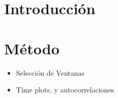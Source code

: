 \documentclass[11pt,a4paper,twoside]{tesis}
\begin{document}
\def\titulo{Licenciado }

\def\autor{Juan Manuel Pérez}
\def\tituloTesis{Mimetización entre interlocutores}
\def\runtitulo{Medición de la mimetización entre interlocutores utilizando series de tiempo}
\def\runtitle{Measuring entrainment between speakers using time series}
\def\director{Agustín Gravano}
\def\codirector{Ramiro Gálvez}
\def\lugar{Buenos Aires, 2015}


\frontmatter
\pagestyle{empty}



\tableofcontents

\mainmatter
\pagestyle{headings}


\chapter{Introducción}



\chapter{Método}







\begin{itemize}
\item Selección de Ventanas
\item Time plots, y autocorrelaciones
\end{itemize}

\backmatter



\end{document}
